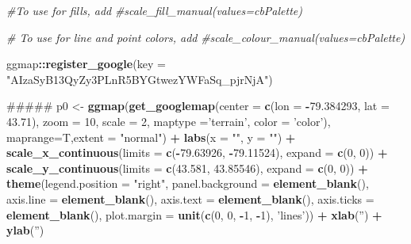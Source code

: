 \documentclass[]{article}
\newenvironment{Shaded}{\begin{snugshade}}{\end{snugshade}}
\newcommand{\KeywordTok}[1]{\textcolor[rgb]{0.13,0.29,0.53}{\textbf{#1}}}
\newcommand{\DataTypeTok}[1]{\textcolor[rgb]{0.13,0.29,0.53}{#1}}
\newcommand{\DecValTok}[1]{\textcolor[rgb]{0.00,0.00,0.81}{#1}}
\newcommand{\FloatTok}[1]{\textcolor[rgb]{0.00,0.00,0.81}{#1}}
\newcommand{\StringTok}[1]{\textcolor[rgb]{0.31,0.60,0.02}{#1}}
\newcommand{\CommentTok}[1]{\textcolor[rgb]{0.56,0.35,0.01}{\textit{#1}}}
\newcommand{\OperatorTok}[1]{\textcolor[rgb]{0.81,0.36,0.00}{\textbf{#1}}}
\newcommand{\NormalTok}[1]{#1}
\begin{document}
\begin{Shaded}
\begin{Highlighting}[]
{{{{\CommentTok{#To use for fills, add}
\CommentTok{#scale_fill_manual(values=cbPalette)}

\CommentTok{# To use for line and point colors, add}
\CommentTok{#scale_colour_manual(values=cbPalette)}


\NormalTok{ggmap}\OperatorTok{::}\KeywordTok{register_google}\NormalTok{(}\DataTypeTok{key =} \StringTok{"AIzaSyB13QyZy3PLnR5BYGtwezYWFaSq_pjrNjA"}\NormalTok{)}


\NormalTok{#####}
\NormalTok{p0 <-}\StringTok{ }\KeywordTok{ggmap}\NormalTok{(}\KeywordTok{get_googlemap}\NormalTok{(}\DataTypeTok{center =} \KeywordTok{c}\NormalTok{(}\DataTypeTok{lon =} \OperatorTok{-}\FloatTok{79.384293}\NormalTok{, }\DataTypeTok{lat =} \FloatTok{43.71}\NormalTok{),}
                    \DataTypeTok{zoom =} \DecValTok{10}\NormalTok{, }\DataTypeTok{scale =} \DecValTok{2}\NormalTok{,}
                    \DataTypeTok{maptype =}\StringTok{'terrain'}\NormalTok{,}
                    \DataTypeTok{color =} \StringTok{'color'}\NormalTok{), }\DataTypeTok{maprange=}\NormalTok{T,}\DataTypeTok{extent =} \StringTok{"normal"}\NormalTok{) }\OperatorTok{+}
\StringTok{    }\KeywordTok{labs}\NormalTok{(}\DataTypeTok{x =} \StringTok{""}\NormalTok{, }\DataTypeTok{y =} \StringTok{""}\NormalTok{) }\OperatorTok{+}
\StringTok{    }\KeywordTok{scale_x_continuous}\NormalTok{(}\DataTypeTok{limits =} \KeywordTok{c}\NormalTok{(}\OperatorTok{-}\FloatTok{79.63926}\NormalTok{, }\OperatorTok{-}\FloatTok{79.11524}\NormalTok{), }\DataTypeTok{expand =} \KeywordTok{c}\NormalTok{(}\DecValTok{0}\NormalTok{, }\DecValTok{0}\NormalTok{)) }\OperatorTok{+}
\KeywordTok{scale_y_continuous}\NormalTok{(}\DataTypeTok{limits =} \KeywordTok{c}\NormalTok{(}\FloatTok{43.581}\NormalTok{, }\FloatTok{43.85546}\NormalTok{), }\DataTypeTok{expand =} \KeywordTok{c}\NormalTok{(}\DecValTok{0}\NormalTok{, }\DecValTok{0}\NormalTok{)) }\OperatorTok{+}
\StringTok{  }\KeywordTok{theme}\NormalTok{(}\DataTypeTok{legend.position =} \StringTok{"right"}\NormalTok{, }
        \DataTypeTok{panel.background =} \KeywordTok{element_blank}\NormalTok{(),}
        \DataTypeTok{axis.line =} \KeywordTok{element_blank}\NormalTok{(),}
        \DataTypeTok{axis.text =} \KeywordTok{element_blank}\NormalTok{(),}
        \DataTypeTok{axis.ticks =} \KeywordTok{element_blank}\NormalTok{(),}
        \DataTypeTok{plot.margin =} \KeywordTok{unit}\NormalTok{(}\KeywordTok{c}\NormalTok{(}\DecValTok{0}\NormalTok{, }\DecValTok{0}\NormalTok{, }\OperatorTok{-}\DecValTok{1}\NormalTok{, }\OperatorTok{-}\DecValTok{1}\NormalTok{), }\StringTok{'lines'}\NormalTok{)) }\OperatorTok{+}
\StringTok{  }\KeywordTok{xlab}\NormalTok{(}\StringTok{''}\NormalTok{) }\OperatorTok{+}
\StringTok{  }\KeywordTok{ylab}\NormalTok{(}\StringTok{''}\NormalTok{)}

}}}}
\end{Highlighting}
\end{Shaded}
\end{document}
